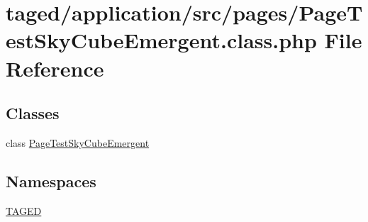 \hypertarget{_page_test_sky_cube_emergent_8class_8php}{}\section{taged/application/src/pages/\+Page\+Test\+Sky\+Cube\+Emergent.class.\+php File Reference}
\label{_page_test_sky_cube_emergent_8class_8php}
\subsection*{Classes}
\begin{DoxyCompactItemize}
\item 
class \hyperlink{class_page_test_sky_cube_emergent}{Page\+Test\+Sky\+Cube\+Emergent}
\end{DoxyCompactItemize}
\subsection*{Namespaces}
\begin{DoxyCompactItemize}
\item 
 \hyperlink{namespace_t_a_g_e_d}{T\+A\+G\+ED}
\end{DoxyCompactItemize}
